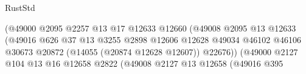 \begin{lexlean}{RustStd}
\begin{coremodule}
                                                        (@49000
                                                          @2095
                                                          @2257
                                                          @13
                                                          @17
                                                          @12633
                                                          @12660
                                                          (@49008
                                                            @2095
                                                            @13
                                                            @12633
                                                            (@49016
                                                              @626
                                                              @37
                                                              @13
                                                              @3255
                                                              @2898
                                                              @12606
                                                              @12628
                                                              @49034
                                                              @46102
                                                              @46106
                                                              @30673
                                                              @20872
                                                              (@14055 (@20874 @12628 @12607))
                                                              @22676))
                                                          (@49000
                                                            @2127
                                                            @104
                                                            @13
                                                            @16
                                                            @12658
                                                            @2822
                                                            (@49008
                                                              @2127
                                                              @13
                                                              @12658
                                                              (@49016
                                                                @395

\end{coremodule}
\end{lexlean}
